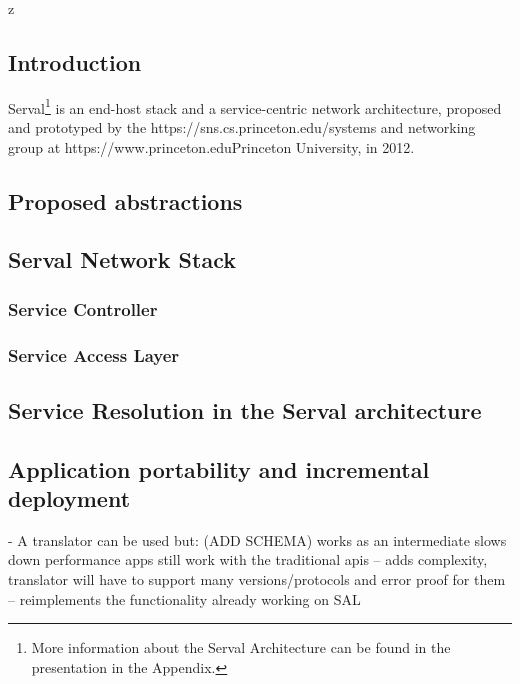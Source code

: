 z\subsection{Introduction}
Serval\footnote{More information about the Serval Architecture can be found in the presentation in the Appendix.} is an end-host stack and a service-centric network architecture, proposed and prototyped by the {https://sns.cs.princeton.edu/}{systems and networking group} at {https://www.princeton.edu}{Princeton University}, in 2012.


\subsection{Proposed abstractions}
\subsection{Serval Network Stack}
\subsubsection{Service Controller}
\subsubsection{Service Access Layer}
\subsection{Service Resolution in the Serval architecture}

\subsection{Application portability and incremental deployment}
- A translator can be used but: (ADD SCHEMA)
works as an intermediate
slows down performance
apps still work with the traditional apis
 -- adds complexity, translator will have to support many versions/protocols and error proof for them
 -- reimplements the functionality already working on SAL




